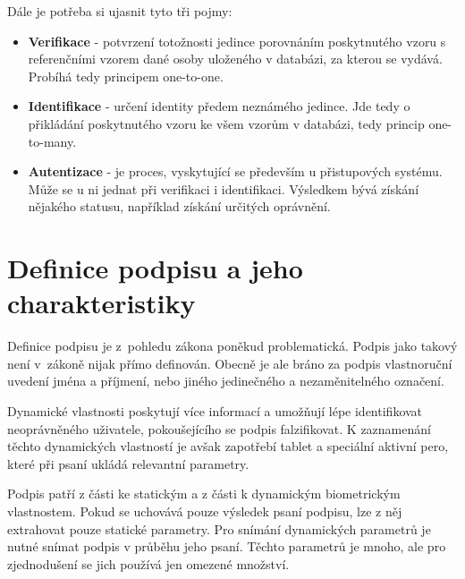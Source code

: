 Dále je potřeba si ujasnit tyto tři pojmy:
\begin{itemize}
  \item{\textbf{Verifikace} - potvrzení totožnosti jedince porovnáním poskytnutého vzoru s referenčními vzorem dané osoby uloženého v databázi, %
  za kterou se vydává. Probíhá tedy principem one-to-one.}                                                                                      %
  \item{\textbf{Identifikace} - určení identity předem neznámého jedince.                                                                       %
  Jde tedy o přikládání poskytnutého vzoru ke všem vzorům v databázi, tedy princip one-to-many.}                                                %
  \item{\textbf{Autentizace} - je proces, vyskytující se především u přistupových systému.                                                      %
  Může se u ni jednat při verifikaci i identifikaci.                                                                                            %
  Výsledkem bývá získání nějakého statusu, například získání určitých oprávnění.}                                                               %
\end{itemize}


\section{Definice podpisu a jeho charakteristiky}
Definice podpisu je z~pohledu zákona poněkud problematická. 
Podpis jako takový není v~zákoně nijak přímo definován. 
Obecně je ale bráno za podpis vlastnoruční uvedení jména a příjmení, nebo jiného jedinečného a nezaměnitelného označení. %

Dynamické vlastnosti poskytují více informací a umožňují lépe identifikovat neoprávněného uživatele, pokoušejícího se podpis falzifikovat.    %
K zaznamenání těchto dynamických vlastností je avšak zapotřebí tablet a speciální aktivní pero, které při psaní ukládá relevantní parametry.  %

Podpis patří z části ke statickým a z části k dynamickým biometrickým vlastnostem.
Pokud se uchovává pouze výsledek psaní podpisu, lze z něj extrahovat pouze statické parametry.
Pro snímání dynamických parametrů je nutné snímat podpis v průběhu jeho psaní.
Těchto parametrů je mnoho, ale pro zjednodušení se jich používá jen omezené množství.

